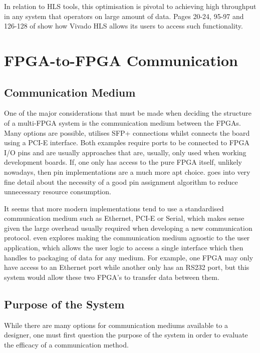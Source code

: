 In relation to HLS tools, this optimisation is pivotal to achieving high throughput in any system that operators on large amount of data. Pages 20-24, 95-97 and 126-128 of \cite{vivado-optmisation-manual} show how Vivado HLS allows its users to access such functionality.


\section{FPGA-to-FPGA Communication}
\label{sec:bg:comm}

\subsection{Communication Medium}

One of the major considerations that must be made when deciding the structure of a multi-FPGA system is the communication medium between the FPGAs. Many options are possible, \cite{10.1145/3358192} utilises SFP+ connections whilst \cite{10.1145/3337821.3337846} connects the board using a PCI-E interface. Both examples require ports to be connected to FPGA I/O pins and are usually approaches that are, usually, only used when working development boards. If, one only has access to the pure FPGA itself, unlikely nowadays, then pin implementations are a much more apt choice. \cite{658564} goes into very fine detail about the necessity of a good pin assignment algorithm to reduce unnecessary resource consumption.

It seems that more modern implementations tend to use a standardised communication medium such as Ethernet, PCI-E or Serial, which makes sense given the large overhead usually required when developing a new communication protocol. \cite{7890234} even explores making the communication medium agnostic to the user application, which allows the user logic to access a single interface which then handles to packaging of data for any medium. For example, one FPGA may only have access to an Ethernet port while another only has an RS232 port, but this system would allow these two FPGA's to transfer data between them.

\subsection{Purpose of the System}

While there are many options for communication mediums available to a designer, one must first question the purpose of the system in order to evaluate the efficacy of a communication method. 

